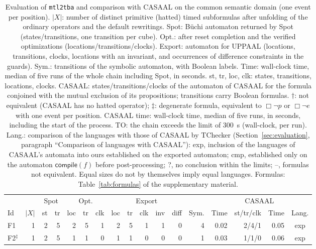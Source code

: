 \begin{table}[t]
\centering
\caption{Evaluation of \texttt{mtl2tba} and comparison with CASAAL on the common semantic domain (one event per position).  $|X|$: number of distinct primitive (hatted) timed subformulas after unfolding of the ordinary operators and the default rewritings.  Spot: B\"uchi automaton returned by Spot (states/transitions, one transition per cube).  Opt.: after reset completion and the verified optimizations (locations/transitions/clocks).  Export: automaton for UPPAAL (locations, transitions, clocks, locations with an invariant, and occurrences of difference constraints in the guards).  Sym.: transitions of the symbolic automaton, with Boolean labels.  Time: wall-clock time, median of five runs of the whole chain including Spot, in seconds.  st, tr, loc, clk: states, transitions, locations, clocks.  CASAAL: states/transitions/clocks of the automaton of CASAAL for the formula conjoined with the mutual exclusion of its propositions; transitions carry Boolean formulas.  $\dagger$: not equivalent (CASAAL has no hatted operator); $\ddagger$: degenerate formula, equivalent to $\Box\neg p$ or $\Box\neg e$ with one event per position.  CASAAL time: wall-clock time, median of five runs, in seconds, including the start of the process.  TO: the chain exceeds the limit of 300~s (wall-clock, per run).  Lang.: comparison of the languages with those of CASAAL by TChecker (Section~\ref{sec:evaluation}, paragraph ``Comparison of languages with CASAAL''): exp, inclusion of the languages of CASAAL's automata into ours established on the exported automaton; cmp, established only on the automaton $\mathsf{compile}(f)$ before post-processing; ?, no conclusion within the limits; --, formulas not equivalent.  Equal sizes do not by themselves imply equal languages.  Formulas: Table~\ref{tab:formulas} of the supplementary material.}
\label{tab:evaluation}
\small
\setlength{\tabcolsep}{4.5pt}
\begin{tabular}{@{}lrrrrrrrrrrrrrrrc@{}}
\toprule
 & & \multicolumn{2}{c}{Spot} & \multicolumn{3}{c}{Opt.} & \multicolumn{5}{c}{Export} & & & \multicolumn{2}{c}{CASAAL} & \\
\cmidrule(lr){3-4}\cmidrule(lr){5-7}\cmidrule(lr){8-12}\cmidrule(lr){15-16}
Id & $|X|$ & st & tr & loc & tr & clk & loc & tr & clk & inv & diff & Sym. & Time & st/tr/clk & Time & Lang.\\
\midrule
F1 & 1 & 2 & 5 & 2 & 5 & 1 & 2 & 5 & 1 & 1 & 0 & 4 & 0.02 & 2/4/1 & 0.05 & exp\\
F2$^\ddagger$ & 1 & 2 & 5 & 1 & 1 & 0 & 1 & 1 & 0 & 0 & 0 & 1 & 0.03 & 1/1/0 & 0.06 & exp\\

\end{tabular}
\end{table}
